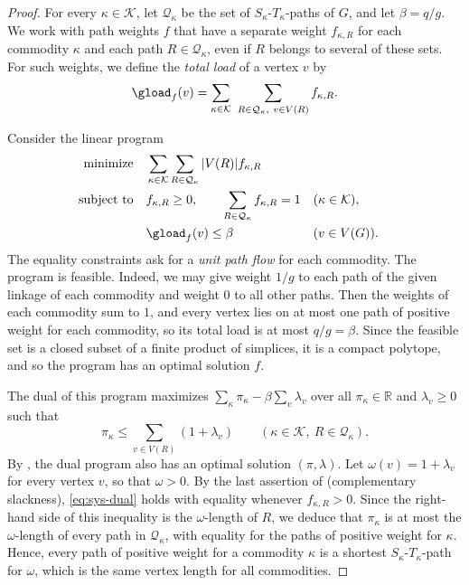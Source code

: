 \documentclass[fontsize=12pt,leading=14pt]{fullpaper}
\newcommand{\Kcal}{\mathcal{K}}
\newcommand{\Qcal}{\mathcal{Q}}
\begin{document}
\begin{proof}
  For every $\kappa\in\Kcal$, let $\Qcal_\kappa$ be the set of $S_\kappa$-$T_\kappa$-paths of $G$, and let $\beta=q/g$.
  We work with path weights $f$ that have a separate weight $f_{\kappa,R}$ for each commodity $\kappa$ and each path $R\in\Qcal_\kappa$, even if $R$ belongs to several of these sets.
  For such weights, we define the \emph{total load} of a vertex $v$ by
  \[
    \gload_f(v)=\sum_{\kappa\in\Kcal}\ \sum_{R\in\Qcal_\kappa,\ v\in V(R)}f_{\kappa,R}.
  \]

  Consider the linear program
  \[
    \begin{aligned}
      \text{minimize}\quad&\sum_{\kappa\in\Kcal}\sum_{R\in\Qcal_\kappa}|V(R)|f_{\kappa,R}\\
      \text{subject to}\quad&f_{\kappa,R}\ge0,\qquad
      \sum_{R\in\Qcal_\kappa}f_{\kappa,R}=1 &&(\kappa\in\Kcal),\\
      &\gload_f(v)\le\beta &&(v\in V(G)).
    \end{aligned}
  \]
  The equality constraints ask for a \emph{unit path flow} for each commodity.
  The program is feasible.
  Indeed, we may give weight $1/g$ to each path of the given linkage of each commodity and weight $0$ to all other paths.
  Then the weights of each commodity sum to $1$, and every vertex lies on at most one path of positive weight for each commodity, so its total load is at most $q/g=\beta$.
  Since the feasible set is a closed subset of a finite product of simplices, it is a compact polytope, and so the program has an optimal solution $f$.

  The dual of this program maximizes $\sum_\kappa\pi_\kappa-\beta\sum_v\lambda_v$ over all $\pi_\kappa\in\mathbb R$ and $\lambda_v\ge0$ such that
  \begin{equation}\label{eq:sys-dual}
    \pi_\kappa\le\sum_{v\in V(R)}(1+\lambda_v)
    \qquad(\kappa\in\Kcal,\ R\in\Qcal_\kappa).
  \end{equation}
  By , the dual program also has an optimal solution $(\pi,\lambda)$.
  Let $\omega(v)=1+\lambda_v$ for every vertex $v$, so that $\omega>0$.
  By the last assertion of  (complementary slackness), \eqref{eq:sys-dual} holds with equality whenever $f_{\kappa,R}>0$.
  Since the right-hand side of this inequality is the $\omega$-length of $R$, we deduce that $\pi_\kappa$ is at most the $\omega$-length of every path in $\Qcal_\kappa$, with equality for the paths of positive weight for $\kappa$.
  Hence, every path of positive weight for a commodity $\kappa$ is a shortest $S_\kappa$-$T_\kappa$-path for $\omega$, which is the same vertex length for all commodities.


\end{proof}
\end{document}
